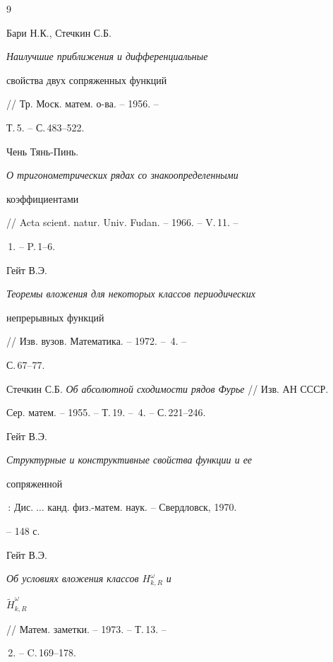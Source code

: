 \begin{thebibliography}{9}







Бари Н.К., Стечкин С.Б. {\em Наилучшие приближения и дифференциальные


свойства двух сопряженных функций} // Тр. Моск. матем. о-ва. -- 1956. --


Т.\,5. -- С.\,483--522.




Чень Тянь-Пинь. {\em О тригонометрических рядах со знакоопределенными


коэффициентами} // Acta scient. natur. Univ. Fudan. -- 1966. -- V.\,11. --


\No\,1. -- P.\,1--6.




Гейт В.Э. {\em Теоремы вложения для некоторых классов периодических


непрерывных функций} // Изв. вузов. Математика. -- 1972. -- \No\,4. --


С.\,67--77.




Стечкин С.Б. {\em Об абсолютной сходимости рядов Фурье} // Изв. АН СССР.


Сер. матем. -- 1955. -- Т.\,19. -- \No\,4. -- С.\,221--246.




Гейт В.Э. {\em Структурные и конструктивные свойства функции и ее


сопряженной}\,: Дис.$\;\dots$ канд. физ.-матем. наук. -- Свердловск, 1970.


-- 148 с.




Гейт В.Э. {\em Об условиях вложения классов $H^\omega_{k,R}$ и


$\widetilde H^\omega_{k,R}$} // Матем. заметки. -- 1973. -- Т.\,13. --


\No\,2. -- C.\,169--178.





\end{thebibliography}





\vskip 2cm















